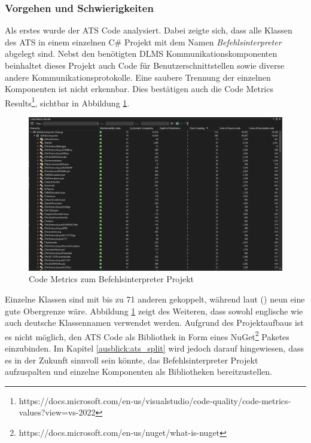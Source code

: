 \subsubsection{Vorgehen und Schwierigkeiten}\label{atsUmsetztung}
Als erstes wurde der ATS Code analysiert.
Dabei zeigte sich, dass alle Klassen des \ac{ATS} in einem einzelnen C\# Projekt mit dem Namen \textit{Befehlsinterpreter} abgelegt sind.
Nebst den benötigten \ac{DLMS} Kommunikationskomponenten beinhaltet dieses Projekt auch Code für Benutzerschnittstellen sowie diverse andere Kommunikationsprotokolle.
Eine saubere Trennung der einzelnen Komponenten ist nicht erkennbar. 
Dies bestätigen auch die Code Metrics Results\footnote{https://docs.microsoft.com/en-us/visualstudio/code-quality/code-metrics-values?view=vs-2022}, sichtbar in Abbildung \ref{fig:codemetrics}.
\begin{figure}[H]
   \centering
   \includegraphics[width=1.0\textwidth]{gfx/S1_CodeMetrics_Befehlsinterpreter.png}
   \caption{
      Code Metrics zum Befehlsinterpreter Projekt
      }
      \label{fig:codemetrics}
\end{figure}
Einzelne Klassen sind mit bis zu 71 anderen gekoppelt, während laut \citeauthor{quantitativeInvestigationRiskCodeMetrics} (\citeyear{quantitativeInvestigationRiskCodeMetrics}) neun eine gute Obergrenze wäre.
Abbildung \ref{fig:codemetrics} zeigt des Weiteren, dass sowohl englische wie auch deutsche Klassennamen verwendet werden.
Aufgrund des Projektaufbaus ist es nicht möglich, den \ac{ATS} Code als Bibliothek in Form eines NuGet\footnote{https://docs.microsoft.com/en-us/nuget/what-is-nuget} Paketes einzubinden.
Im Kapitel \ref{ausblick:ats_split} wird jedoch darauf hingewiesen, dass es in der Zukunft sinnvoll sein könnte,
das Befehlsinterpreter Projekt aufzuspalten und einzelne Komponenten als Bibliotheken bereitzustellen.

